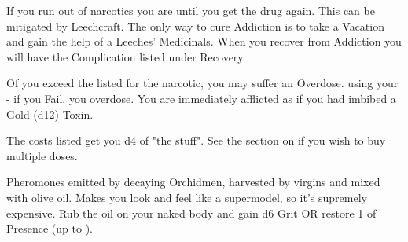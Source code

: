 {\begin{multicols}{2}
  If you run out of narcotics you are  until you get the drug again.  This can be mitigated by Leechcraft. The only way to cure Addiction is to take a Vacation and gain the help of a Leeches' Medicinals\footnotemark.  When you recover from Addiction you will have the Complication listed under Recovery.


  Of you exceed the \MAX listed for the narcotic, you may suffer an Overdose.  \RS using your \VIG - if you Fail, you overdose.  You are immediately afflicted as if you had imbibed a Gold (d12) Toxin\footnotemark[\value{footnote}].

  \cbreak




  The costs listed get you d4 \UD of "the stuff".  See the section on  if you wish to buy multiple doses.



  Pheromones emitted by decaying Orchidmen, harvested by virgins and mixed with olive oil.  Makes you look and feel like a supermodel, so it's supremely expensive.  Rub the oil on your naked body and gain d6 Grit OR restore 1 \UD of Presence (up to \MAX).


\end{multicols}}
